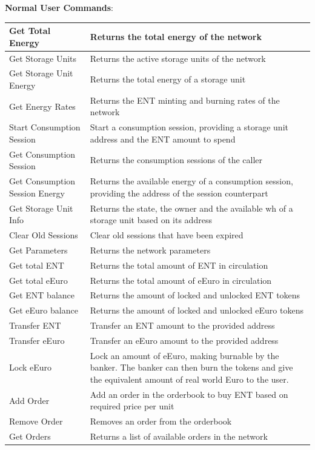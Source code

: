 \textbf{Normal User Commands}:\\
\begin{tabular}{|p{5.5cm}|p{8cm}|}
    \hline
    Get Total Energy & Returns the total energy of the network \\ \hline
    Get Storage Units & Returns the active storage units of the network \\ \hline
    Get Storage Unit Energy & Returns the total energy of a storage unit \\ \hline
    Get Energy Rates & Returns the ENT minting and burning rates of the network \\ \hline
    Start Consumption Session & Start a consumption session, providing a storage unit address and the ENT amount to spend \\ \hline
    Get Consumption Session & Returns the consumption sessions of the caller \\ \hline
    Get Consumption Session Energy & Returns the available energy of a consumption session, providing the address of the session counterpart \\ \hline
    Get Storage Unit Info & Returns the state, the owner and the available wh of a storage unit based on its address \\ \hline
    Clear Old Sessions & Clear old sessions that have been expired \\ \hline
    
    Get Parameters & Returns the network parameters \\ \hline
    Get total ENT & Returns the total amount of ENT in circulation \\ \hline 
    Get total eEuro & Returns the total amount of eEuro in circulation \\ \hline
    Get ENT balance & Returns the amount of locked and unlocked ENT tokens \\ \hline
    Get eEuro balance & Returns the amount of locked and unlocked eEuro tokens \\ \hline
    Transfer ENT & Transfer an ENT amount to the provided address \\ \hline
    Transfer eEuro & Transfer an eEuro amount to the provided address \\ \hline
    Lock eEuro & Lock an amount of eEuro, making burnable by the banker. The banker can then burn the tokens and give the equivalent amount of real world Euro to the user. \\ \hline

    Add Order & Add an order in the orderbook to buy ENT based on required price per unit \\ \hline
    Remove Order & Removes an order from the orderbook \\ \hline
    Get Orders & Returns a list of available orders in the network \\ \hline
\end{tabular}

